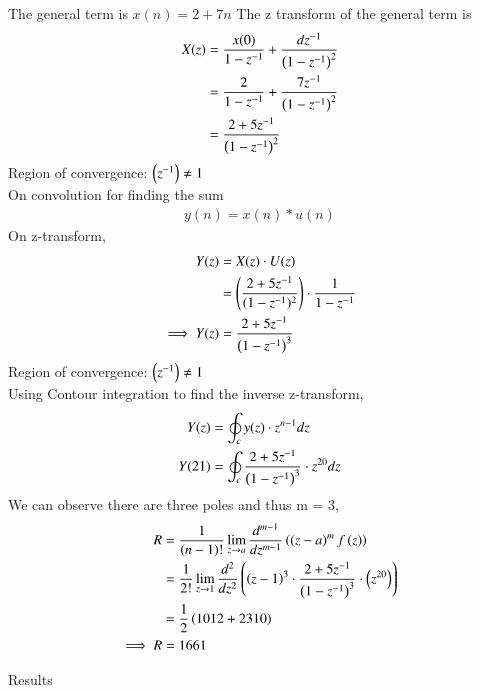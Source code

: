 \documentclass[journal,12pt,twocolumn]{IEEEtran}
\theoremstyle{remark}
\begin{document}
\begin{enumerate}
The general term is $x(n)=2+7n$
The z transform of the general term is 
\begin{align}
X(z)&= \frac{x(0)}{1-z^{-1}}+\frac{dz^{-1}}{\left(1-z^{-1}\right)^2} \\
&=\frac{2}{1-z^{-1}}+\frac{7z^{-1}}{{\left(1-z^{-1}\right)^2}}\\
&=\frac{2+5z^{-1}}{\left(1-z^{-1}\right)^2}
\end{align}
Region of convergence: $\left(z^{-1}\right)\neq 1$\\
On convolution for finding the sum
\begin{align}
    y(n)=x(n)\ast u(n)
\end{align}
On z-transform, 
\begin{align}
Y(z)&=X(z)\cdot U(z)\\
    &=\left(\frac{{2+5z^{-1}}}{{(1-z^{-1})^2}}\right) \cdot \frac{1}{{1-z^{-1}}}\\
  \implies Y(z)  &= \frac{2+5z^{-1}}{\left(1-z^{-1}\right)^3}
\end{align}
Region of convergence: $\left(z^{-1}\right)\neq 1$\\
Using Contour integration to find the inverse z-transform,
\begin{align}
    Y(z)&=\oint_c y(z)\cdot z^{n-1}dz\\
    Y(21)&=\oint_c \frac{2+5z^{-1}}{\left(1-z^{-1}\right)^3}\cdot z^{20}dz
\end{align}
We can observe there are three poles and thus m = 3,
\begin{align}
    R&=\frac{1}{\left(n-1\right)!} \lim_{z \to a} \frac{d^{m-1}}{dz^{m-1}}\left(\left(z-a\right)^mf\left(z\right)\right)\\
    &=\frac{1}{2!}\lim_{z \to 1} \frac{d^2}{dz^2} \left(\left(z-1\right)^3\cdot \frac{2+5z^{-1}}{\left(1-z^{-1}\right)^3}\cdot \left(z^{20}\right)\right)\\
    &=\frac{1}{2}\left(1012+2310\right)\\
    \implies R&=1661
\end{align}

\begin{table}[h!]
\centering

\vspace{0.5cm}
\caption{\normalsize Results}
\end{table}


\begin{figure}[h]
    \centering  


\end{figure}
\end{enumerate}
\end{document}
